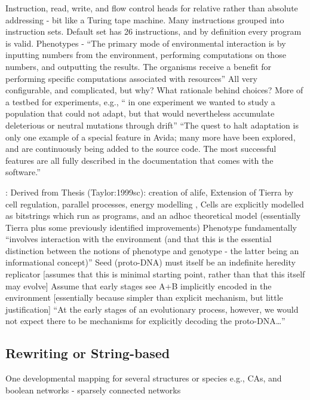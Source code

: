 Instruction, read, write, and flow control heads for relative rather than absolute addressing - bit like a Turing tape machine. Many instructions grouped into instruction sets. Default set has 26 instructions, and by definition every program is valid.
Phenotypes - ``The primary mode of environmental interaction is by inputting numbers from the environment, performing computations on those numbers, and outputting the results. The organisms receive a
benefit for performing specific computations associated with resources''
All very configurable, and complicated, but why? What rationale behind choices? More of a testbed for experiments, e.g., `` in one experiment we wanted to study a population that could not adapt, but that would nevertheless accumulate deleterious or neutral mutations through drift''
``The quest to halt adaptation is only one example of a special feature in Avida; many more have been explored, and are continuously being added to the source code. The most successful features are all fully described in the documentation that comes with the software.''

\parencite{Taylor2001}:
Derived from Thesis (Taylor:1999sc): creation of \gls{alife}, Extension of Tierra \cite{Ray1991} by cell regulation, parallel processes, energy modelling \cite[p.4]{Taylor:1999sc}, Cells are explicitly modelled as bitstrings which run as programs, and an adhoc theoretical model (essentially Tierra plus some previously identified improvements)
Phenotype fundamentally ``involves interaction with the environment (and that this is the essential distinction between the notions of phenotype and genotype - the latter being an informational concept)'' \parencite{Taylor2001}
Seed (proto-DNA) must itself be an indefinite heredity replicator {[}assumes that this is minimal starting point, rather than that this itself may evolve{]} \parencite{Taylor2001}
Assume that early stages see A+B implicitly encoded in the environment {[}essentially because simpler than explicit mechanism, but little justification{]} ``At the early stages of an evolutionary process, however, we would not expect there to be mechanisms for explicitly decoding the proto-DNA\ldots{}'' \parencite{Taylor2001}
		
\subsection{Rewriting or String-based}

\parencite{Antonakopoulos:2011th}

One developmental mapping for several structures or species e.g., CAs, and boolean networks - sparsely connected networks

